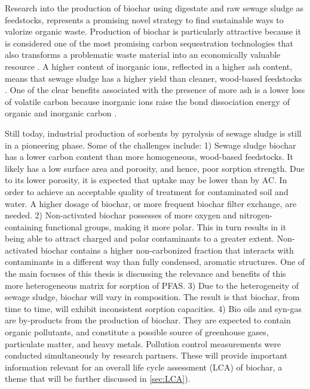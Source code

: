Research into the production of biochar using digestate and raw sewage sludge as feedstocks, represents a promising novel strategy to find sustainable ways to valorize organic waste. Production of biochar is particularly attractive because it is considered one of the most promising carbon sequestration technologies that also transforms a problematic waste material into an economically valuable resource \citep{arvaniti2014sorption}. A higher content of inorganic ions, reflected in a higher ash content, means that sewage sludge has a higher yield than cleaner, wood-based feedstocks \citep{Cantrell2012}. One of the clear benefits associated with the presence of more ash is a lower loss of volatile carbon because inorganic ions raise the bond dissociation energy of organic and inorganic carbon \citep{Cantrell2012,Enders2012}. 

Still today, industrial production of sorbents by pyrolysis of sewage sludge is still in a pioneering phase. Some of the challenges include: 1) Sewage sludge biochar has a lower carbon content than more homogeneous, wood-based feedstocks. It likely has a low surface area and porosity, and hence, poor sorption strength. Due to its lower porosity, it is expected that uptake may be lower than by AC. In order to achieve an acceptable quality of treatment for contaminated soil and water. A higher dosage of biochar, or more frequent biochar filter exchange, are needed. 2) Non-activated biochar possesses of more oxygen and nitrogen-containing functional groups, making it more polar. This in turn results in it being able to attract charged and polar contaminants to a greater extent. Non-activated biochar contains a higher non-carbonized fraction that interacts with contaminants in a different way than fully condensed, aromatic structures. One of the main focuses of this thesis is discussing the relevance and benefits of this more heterogeneous matrix for sorption of PFAS. 3) Due to the heterogeneity of sewage sludge, biochar will vary in composition. The result is that biochar, from time to time, will exhibit inconsistent sorption capacities. 4) Bio oils and syn-gas are by-products from the production of biochar. They are expected to contain organic pollutants, and constitute a possible source of greenhouse gases, particulate matter, and heavy metals. Pollution control measurements were conducted simultaneously by research partners. These will provide important information relevant for an overall life cycle assessment (LCA) of biochar, a theme that will be further discussed in \cref{sec:LCA}). 

